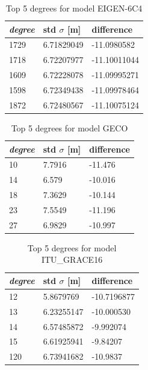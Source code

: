     \begin{table}[]
    	\centering
    	\caption{Top 5 degrees for model EIGEN-6C4}
    	\label{table:ggm_models}
    	\begin{tabular}{@{}lll@{}}
    		\toprule
    		\emph{degree} & std $\sigma$ [m]  & difference\\ \midrule
    		
    		1729 &6.71829049 &-11.0980582\\
    		1718 &6.72207977 &-11.10011044\\
    		1609 &6.72228078 &-11.09995271\\
    		1598 &6.72349438 &-11.09978464\\
    		1872 & 6.72480567 & -11.10075124\\ \bottomrule
    		
    	\end{tabular}
    \end{table}
    
    
      \begin{table}[]
      	\centering
      	\caption{Top 5 degrees for model GECO}
      	\label{table:ggm_models_geco}
      	\begin{tabular}{@{}lll@{}}
      		\toprule
      		\emph{degree} & std $\sigma$ [m]  & difference\\ \midrule
      		10 & 7.7916 & -11.476 \\
      		14 &6.579  &-10.016 \\
      		18 &7.3629 &-10.144 \\
      		23 &7.5549 &-11.196 \\
      		27 &6.9829 &-10.997\\ \bottomrule
      		
      	\end{tabular}
      \end{table}
    
    
      \begin{table}[]
      	\centering
      	\caption{Top 5 degrees for model ITU\_GRACE16}
      	\label{table:ggm_models_itu_grace}
      	\begin{tabular}{@{}lll@{}}
      		\toprule
      		\emph{degree} & std $\sigma$ [m]  & difference\\ \midrule
      		12  &   5.8679769 &  -10.7196877\\
      		13  &  6.23255147 & -10.000530\\
      		14  & 6.57485872 &  -9.992074\\
      		15  & 6.61925941  & -9.84207\\
      		120 & 6.73941682 & -10.9837\\ \bottomrule
      		
      	\end{tabular}
      \end{table}
      
